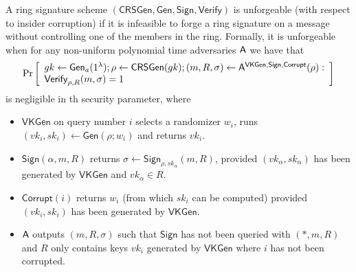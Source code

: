 \begin{definition}
A ring signature scheme $(\mathsf{CRSGen}, \mathsf{Gen}, \mathsf{Sign}, \mathsf{Verify})$
is unforgeable (with respect to insider corruption) if it is infeasible to forge a ring
signature on a message without controlling one of the members in the ring. Formally, it
is unforgeable when for any non-uniform polynomial
time adversaries $\mathsf{A}$ we have that
$$
\Pr\left[\begin{array}{l}
gk\gets\mathsf{Gen}_a(1^\lambda);\rho\gets\mathsf{CRSGen}(gk);(m,R,\sigma)\gets\mathsf{A}^{\mathsf{VKGen},\mathsf{Sign},\mathsf{Corrupt}}(\rho):\\
\mathsf{Verify}_{\rho,R}(m,\sigma)=1
\end{array}\right]
$$
is negligible in th security parameter, where

\begin{itemize}
\item $\mathsf{VKGen}$ on query number $i$ selects a randomizer $w_i$, runs $(vk_i,sk_i) \gets \mathsf{Gen}(\rho; w_i)$
and returns $vk_i$.
\item $\mathsf{Sign}(\alpha, m, R)$ returns $\sigma \gets \mathsf{Sign}_{\rho,sk_\alpha}(m, R)$, provided $(vk_\alpha, sk_\alpha)$ has been generated
by $\mathsf{VKGen}$ and $vk_\alpha\in R$.
\item $\mathsf{Corrupt}(i)$ returns $w_i$ (from which $sk_i$ can be computed) provided $(vk_i, sk_i)$ has
been generated by $\mathsf{VKGen}$.
\item $\mathsf{A}$ outputs $(m, R, \sigma)$ such that $\mathsf{Sign}$ has not been queried with $(*, m, R)$ and $R$
only contains keys $vk_i$ generated by $\mathsf{VKGen}$ where $i$ has not been corrupted.
\end{itemize}
\end{definition}

